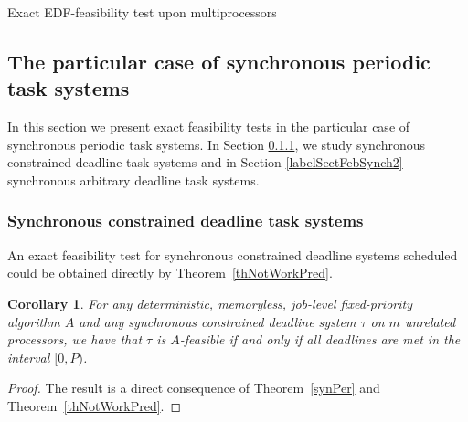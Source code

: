 \documentclass[a4paper,11pt]{article}
\newtheorem{Corollary}[Theorem]{Corollary}
\begin{document}
\begin{algorithm}
\caption{Exact EDF-feasibility test upon multiprocessors\label{algoedf}}
\end{algorithm}

\subsection{The particular case of synchronous periodic task
  systems} \label{labelSectFebSynch}

In this section we present exact feasibility tests in the particular
case of synchronous periodic task systems. In Section
\ref{labelSectFebSynch1}, we study synchronous constrained deadline
task systems and in Section \ref{labelSectFebSynch2} synchronous
arbitrary deadline task systems.

\subsubsection{Synchronous constrained deadline task
  systems} \label{labelSectFebSynch1}

An exact feasibility test for synchronous constrained deadline systems
scheduled could be obtained directly by Theorem~\ref{thNotWorkPred}.

\begin{Corollary}\label{fixIdent2} For any deterministic, memoryless,
  job-level fixed-priority algorithm $A$ and any synchronous constrained deadline system $\tau$ on $m$ unrelated processors, we have that $\tau$ is $A$-feasible if and only if all
  deadlines are met in the interval $[0, P)$.
\end{Corollary}

\begin{proof}
  The result is a direct consequence of Theorem~\ref{synPer} and
  Theorem~\ref{thNotWorkPred}.
\end{proof}
\end{document}
